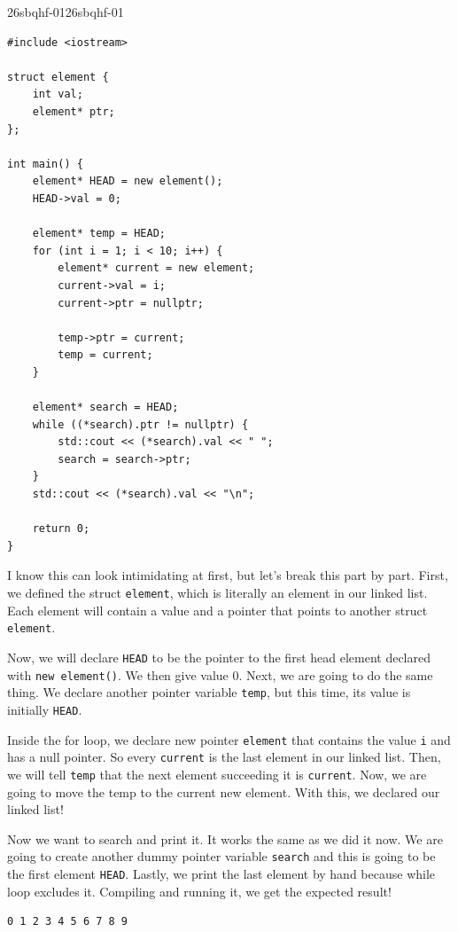 \documentclass[../../../main.tex]{subfiles}
\begin{document}
\begin{cppbox}{26sbqhf-01}{26sbqhf-01}
\begin{lstlisting}[style=cppstyle]
#include <iostream>

struct element {
    int val;
    element* ptr;
};

int main() {
    element* HEAD = new element();
    HEAD->val = 0;

    element* temp = HEAD;
    for (int i = 1; i < 10; i++) {
        element* current = new element;
        current->val = i;
        current->ptr = nullptr;

        temp->ptr = current;
        temp = current;
    }

    element* search = HEAD;
    while ((*search).ptr != nullptr) {
        std::cout << (*search).val << " ";
        search = search->ptr;
    }
    std::cout << (*search).val << "\n";

    return 0;
}
\end{lstlisting}
\end{cppbox}

I know this can look intimidating at first, but let's break this part
by part. First, we defined the struct \verb|element|, which is
literally an element in our linked list. Each element will contain
a value and a pointer that points to another struct \verb|element|.

Now, we will declare \verb|HEAD| to be the pointer to the first head
element declared with \verb|new element()|. We then give value $0$.
Next, we are going to do the same thing. We declare another pointer
variable \verb|temp|, but this time, its value is initially
\verb|HEAD|.

Inside the for loop, we declare new pointer \verb|element|
that contains the value \verb|i| and has a null pointer.
So every \verb|current| is the last element in our linked list.
Then, we will tell \verb|temp| that the next element succeeding it
is \verb|current|. Now, we are going to move the temp to the current
new element. With this, we declared our linked list!

Now we want to search and print it. It works the same as we did it
now. We are going to create another dummy pointer variable
\verb|search| and this is going to be the first element \verb|HEAD|.
Lastly, we print the last element by hand because while loop
excludes it. Compiling and running it, we get the expected result!

\begin{outputbox}
\begin{lstlisting}[style=basic]
0 1 2 3 4 5 6 7 8 9
\end{lstlisting}
\end{outputbox}
\end{document}
